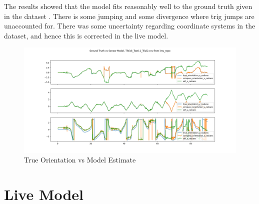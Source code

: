 \documentclass[conference]{IEEEtran}
\begin{document}
The results showed that the model fits reasonably well to the ground truth given in the dataset \cite{b20}.  There is some jumping and some divergence where trig jumps are unaccounted for. There was some uncertainty regarding coordinate systems in the dataset, and hence this is corrected in the live model.  
\begin{figure}[h!]
  \includegraphics[width=\columnwidth]{estimate_vs_ground_truth.png}
  \caption{True Orientation vs Model Estimate}
  \label{fig:true_orientation_vs_estimate}
\end{figure}

\section{Live Model}
\end{document}
